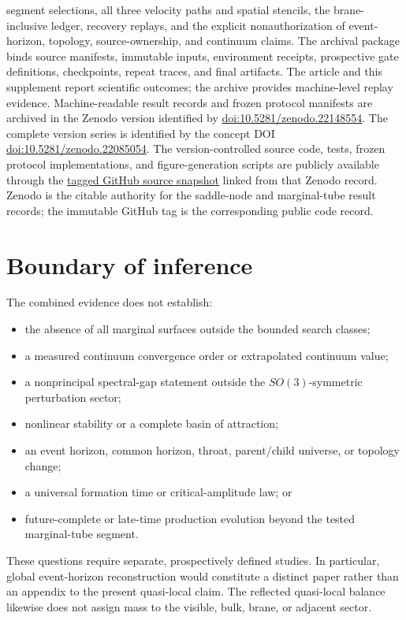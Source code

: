 \documentclass[11pt]{article}
\begin{document}
segment selections, all three velocity paths and spatial stencils, the
brane-inclusive ledger, recovery replays, and the explicit nonauthorization
of event-horizon, topology, source-ownership, and continuum claims.
The archival package binds source manifests, immutable inputs, environment
receipts, prospective gate definitions, checkpoints, repeat traces, and final
artifacts.  The article and this supplement report scientific outcomes; the
archive provides machine-level replay evidence.  Machine-readable result
records and frozen protocol manifests are archived in the Zenodo version
identified by
\href{https://doi.org/10.5281/zenodo.22148554}{doi:10.5281/zenodo.22148554}.
The complete version series is identified by the concept DOI
\href{https://doi.org/10.5281/zenodo.22085054}{doi:10.5281/zenodo.22085054}.
The version-controlled source code, tests, frozen protocol implementations,
and figure-generation scripts are publicly available through the
\href{https://github.com/RonBibb/free-boundary-mots-saddle-node/tree/zenodo-22148554}{tagged GitHub source snapshot}
linked from that Zenodo record.  Zenodo is the citable authority for the
saddle-node and marginal-tube result records; the immutable GitHub tag is the
corresponding public code record.

\section{Boundary of inference}

The combined evidence does not establish:
\begin{itemize}
\item the absence of all marginal surfaces outside the bounded search classes;
\item a measured continuum convergence order or extrapolated continuum value;
\item a nonprincipal spectral-gap statement outside the $SO(3)$-symmetric
perturbation sector;
\item nonlinear stability or a complete basin of attraction;
\item an event horizon, common horizon, throat, parent/child universe, or
topology change;
\item a universal formation time or critical-amplitude law; or
\item future-complete or late-time production evolution beyond the tested
marginal-tube segment.
\end{itemize}
These questions require separate, prospectively defined studies.  In
particular, global event-horizon reconstruction would constitute a distinct
paper rather than an appendix to the present quasi-local claim.  The reflected
quasi-local balance likewise does not assign mass to the visible, bulk, brane,
or adjacent sector.

\begingroup
\small
\small


\endgroup
\end{document}
